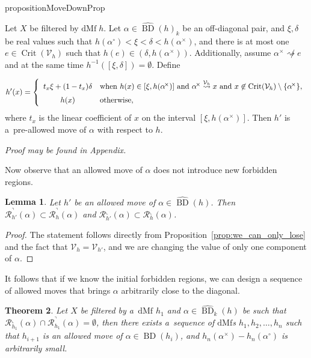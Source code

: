 \documentclass[a4paper,12pt, USenglish,cleveref,autoref,thm-restate]{article}
\newtheorem{theorem}{Theorem}
\newtheorem{lemma}[theorem]{Lemma}
\newcommand{\proofappendix}{\textit{\small Proof may be found in Appendix.}}
\newcommand{\mf}{h}
\newcommand{\omf}{h'}
\DeclareMathOperator{\bd}{BD}
\newcommand{\upbd}{\hat{\bd}}
\newcommand{\dmf}{\text{dMf}}
\newcommand{\fhR}{\mathcal{R}^\urcorner}
\newcommand{\fcR}{\mathcal{R}^\llcorner}
\newcommand{\cx}{x}
\newcommand{\ce}{e}
\newcommand{\bth}[1]{#1^\circ}
\newcommand{\dth}[1]{#1^{\!\times}}
\newcommand{\bds}{\alpha}
\newcommand{\cV}{\mathcal{V}}
\def\pathh#1{\overset{#1}{\rightsquigarrow}}
\def\notpathh#1{\overset{#1}{\not\rightsquigarrow}}
\DeclareMathOperator{\crit}{Crit}
\def\pathh#1{\overset{#1}{\rightsquigarrow}}
\begin{document}
\begin{restatable}{proposition}{MoveDownProp}\label{prop:pre_allowed_move_down}

Let $X$ be filtered by $\dmf \; \mf$. Let $\bds \in \upbd(\mf)_{k}$ be an off-diagonal pair, and $\xi,\delta$ be real values such that  $ \mf(\bth\bds) < \xi < \delta < \mf(\dth\bds)$, and there is at most one $\ce \in \crit(\cV_{\mf})$ such that $\mf(\ce) \in (\delta, \mf(\dth\bds))$. Additionally, assume $\dth\bds \notpathh{} \ce$ and at the same time $\mf^{-1}([\xi,\delta]) = \emptyset$. 
Define 

\[
\omf(x)=
\left\{
\begin{array}{c@{\quad}l}
t_x\xi+(1-t_x)\delta & \text{when }\mf(x)\in [\xi,\mf(\dth\bds)] \text{ and } \dth\bds \pathh{\cV_{\mf}}   \cx \text{ and } x \not \in \crit(\cV_{\mf})\setminus\{\dth\alpha\},\\[6pt]
h(x) & \text{otherwise,}
\end{array}
\right.
\]
%
where $t_x$ is the linear coefficient of $x$ on the interval $[\xi,\mf(\dth\bds)]$. Then $\omf$ is a~pre-allowed move of $\bds$ with respect to $\mf$.
    
\end{restatable}

\proofappendix


\noindent Now observe that an allowed move of $\bds$ does not introduce new forbidden regions.


\begin{lemma}\label{lem:we_can_only_lose_regions}
    Let $\omf$ be an allowed move of $\bds \in \upbd(\mf)$. Then $\fhR_{\omf}(\bds) \subset \fhR_{\mf}(\bds)$ and $\fcR_{\omf}(\bds) \subset \fcR_{\mf}(\bds)$.
\end{lemma}

\begin{proof}
    The statement follows directly from Proposition~\ref{prop:we_can_only_lose} and the fact that $\cV_{\mf} = \cV_{\omf}$, and we are changing the value of only one component of $\bds$.
\end{proof}

\noindent It follows that if we know the initial forbidden regions, we can design a sequence of allowed moves that brings $\bds$ arbitrarily close to the diagonal.


\begin{theorem}\label{thm:when_you_can_move_to_diagonal}
    Let $X$ be filtered by a~$\dmf$ $\mf_{1}$ and $\bds \in \upbd_{k}(\mf)$ be such that $\fcR_{\mf_1}(\bds) \cap \fhR_{\mf_1}(\bds) = \emptyset$, then there exists a~sequence of $\dmf$s $\mf_{1}, \mf_{2}, \ldots, \mf_{n}$ such that $\mf_{i+1}$ is an allowed move of $\bds \in \bd(\mf_{i})$, and $\mf_{n}(\dth\bds) - \mf_{n}(\bth\bds)$ is arbitrarily small. 
\end{theorem}
\end{document}
